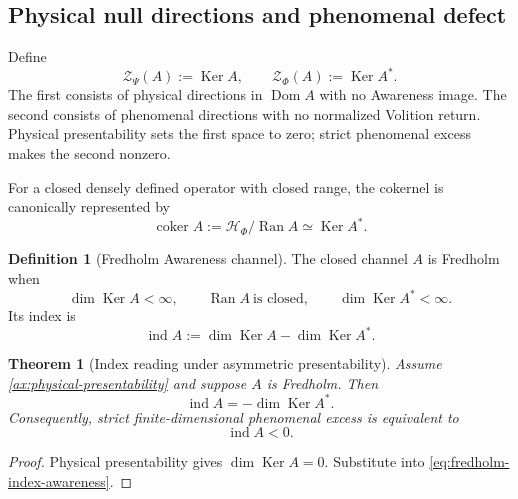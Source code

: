 \documentclass[11pt,reqno]{scrartcl}
\newcommand{\scrHF}{\mathscr H_{\Phi}}
\DeclareMathOperator{\Dom}{Dom}
\DeclareMathOperator{\Ran}{Ran}
\DeclareMathOperator{\Ker}{Ker}
\DeclareMathOperator{\ind}{ind}
\DeclareMathOperator{\coker}{coker}
\theoremstyle{plain}
\newtheorem{theorem}{Theorem}[section]
\theoremstyle{definition}
\newtheorem{definition}[definition]{Definition}
\theoremstyle{remark}
\begin{document}
\subsection{Physical null directions and phenomenal defect}

Define
\begin{equation}
  \mathscr Z_{\Psi}(A):=\Ker A,
  \qquad
  \mathscr Z_{\Phi}(A):=\Ker A^*.
  \label{eq:sectoral-zero-spaces}
\end{equation}
The first consists of physical directions in $\Dom A$ with no Awareness
image.  The second consists of phenomenal directions with no normalized
Volition return.  Physical presentability sets the first space to zero;
strict phenomenal excess makes the second nonzero.

For a closed densely defined operator with closed range, the cokernel is
canonically represented by
\begin{equation}
  \coker A
  :=\scrHF/\Ran A
  \simeq\Ker A^*.
  \label{eq:cokernel-kernel-adjoint}
\end{equation}

\begin{definition}[Fredholm Awareness channel]
\label{def:fredholm-awareness}
The closed channel $A$ is Fredholm when
\begin{equation}
  \dim\Ker A<\infty,
  \qquad
  \Ran A\ \text{is closed},
  \qquad
  \dim\Ker A^*<\infty.
  \label{eq:fredholm-conditions}
\end{equation}
Its index is
\begin{equation}
  \boxed{
  \ind A
  :=\dim\Ker A-\dim\Ker A^*.}
  \label{eq:fredholm-index-awareness}
\end{equation}
\end{definition}

\begin{theorem}[Index reading under asymmetric presentability]
\label{thm:index-as-phenomenal-excess}
Assume \cref{ax:physical-presentability} and suppose $A$ is Fredholm.  Then
\begin{equation}
  \boxed{
  \ind A=-\dim\Ker A^*.}
  \label{eq:index-negative-excess}
\end{equation}
Consequently, strict finite-dimensional phenomenal excess is equivalent to
\begin{equation}
  \ind A<0.
  \label{eq:negative-index-excess}
\end{equation}
\end{theorem}

\begin{proof}
Physical presentability gives $\dim\Ker A=0$.  Substitute into
\eqref{eq:fredholm-index-awareness}.
\end{proof}
\end{document}
